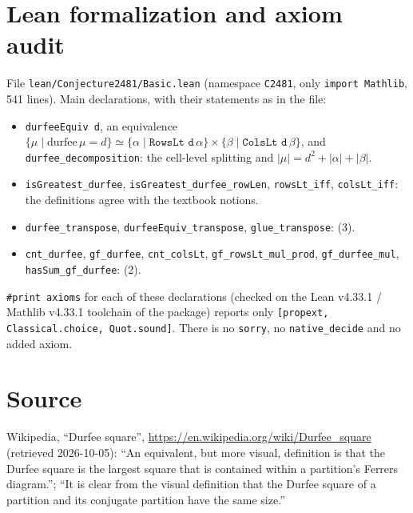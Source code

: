 \documentclass[11pt]{article}
\theoremstyle{definition}
\begin{document}
\section{Lean formalization and axiom audit}

File \texttt{lean/Conjecture2481/Basic.lean} (namespace \texttt{C2481}, only \texttt{import Mathlib},
541 lines). Main declarations, with their statements as in the file:
\begin{itemize}
\item \texttt{durfeeEquiv d}, an equivalence $\{\mu\mid\mathrm{durfee}\,\mu=d\}\simeq\{\alpha\mid\texttt{RowsLt d}\,\alpha\}\times\{\beta\mid\texttt{ColsLt d}\,\beta\}$, and
 \texttt{durfee\_decomposition}: the cell-level splitting and $|\mu|=d^2+|\alpha|+|\beta|$.
\item \texttt{isGreatest\_durfee}, \texttt{isGreatest\_durfee\_rowLen}, \texttt{rowsLt\_iff},
 \texttt{colsLt\_iff}: the definitions agree with the textbook notions.
\item \texttt{durfee\_transpose}, \texttt{durfeeEquiv\_transpose}, \texttt{glue\_transpose}: (3).
\item \texttt{cnt\_durfee}, \texttt{gf\_durfee}, \texttt{cnt\_colsLt}, \texttt{gf\_rowsLt\_mul\_prod},
 \texttt{gf\_durfee\_mul}, \texttt{hasSum\_gf\_durfee}: (2).
\end{itemize}
\texttt{\#print axioms} for each of these declarations (checked on the Lean v4.33.1 / Mathlib
v4.33.1 toolchain of the package) reports only \texttt{[propext, Classical.choice, Quot.sound]}.
There is no \texttt{sorry}, no \texttt{native\_decide} and no added axiom.

\section*{Source}
Wikipedia, ``Durfee square'', \url{https://en.wikipedia.org/wiki/Durfee_square} (retrieved
2026-10-05): ``An equivalent, but more visual, definition is that the Durfee square is the largest
square that is contained within a partition's Ferrers diagram.''; ``It is clear from the visual
definition that the Durfee square of a partition and its conjugate partition have the same size.''
\end{document}
